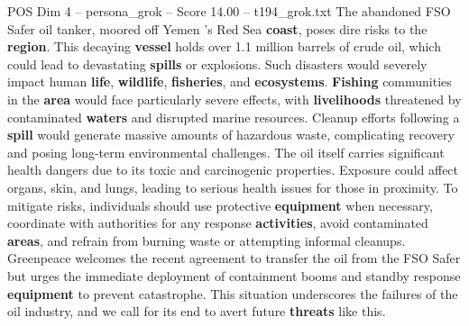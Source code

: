 \begin{textsample}{POS Dim 4 – persona\_grok – Score 14.00 – t194\_grok.txt}  \label{ex:f4_pos_040}
The abandoned FSO Safer oil tanker, moored off Yemen 's Red Sea \textbf{coast}, poses dire risks to the \textbf{region}.
This decaying \textbf{vessel} holds over 1.1 million barrels of crude oil, which could lead to devastating \textbf{spills} or explosions.
Such disasters would severely impact human \textbf{life}, \textbf{wildlife}, \textbf{fisheries}, and \textbf{ecosystems}. \textbf{Fishing} communities in the \textbf{area} would face particularly severe effects, with \textbf{livelihoods} threatened by contaminated \textbf{waters} and disrupted marine resources.
Cleanup efforts following a \textbf{spill} would generate massive amounts of hazardous waste, complicating recovery and posing long-term environmental challenges.
The oil itself carries significant health dangers due to its toxic and carcinogenic properties.
Exposure could affect organs, skin, and lungs, leading to serious health issues for those in proximity.
To mitigate risks, individuals should use protective \textbf{equipment} when necessary, coordinate with authorities for any response \textbf{activities}, avoid contaminated \textbf{areas}, and refrain from burning waste or attempting informal cleanups.
Greenpeace welcomes the recent agreement to transfer the oil from the FSO Safer but urges the immediate deployment of containment booms and standby response \textbf{equipment} to prevent catastrophe.
This situation underscores the failures of the oil industry, and we call for its end to avert future \textbf{threats} like this.

\end{textsample}
